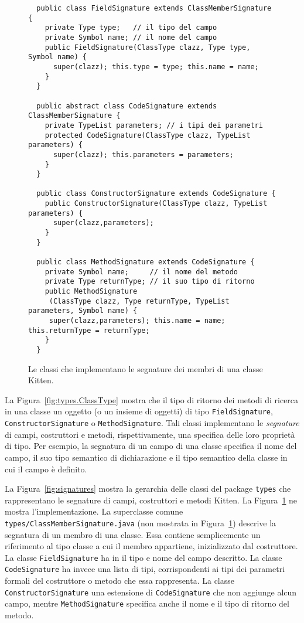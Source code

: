 \begin{figure}[t]
{\small
\begin{verbatim}
  public class FieldSignature extends ClassMemberSignature {
    private Type type;   // il tipo del campo
    private Symbol name; // il nome del campo
    public FieldSignature(ClassType clazz, Type type, Symbol name) {
      super(clazz); this.type = type; this.name = name;
    }
  }

  public abstract class CodeSignature extends ClassMemberSignature {
    private TypeList parameters; // i tipi dei parametri
    protected CodeSignature(ClassType clazz, TypeList parameters) {
      super(clazz); this.parameters = parameters;
    }
  }

  public class ConstructorSignature extends CodeSignature {
    public ConstructorSignature(ClassType clazz, TypeList parameters) {
      super(clazz,parameters);
    }
  }

  public class MethodSignature extends CodeSignature {
    private Symbol name;     // il nome del metodo
    private Type returnType; // il suo tipo di ritorno
    public MethodSignature
     (ClassType clazz, Type returnType, TypeList parameters, Symbol name) {
     super(clazz,parameters); this.name = name; this.returnType = returnType;
    }
  }
\end{verbatim}
}
\caption{Le classi che implementano le segnature dei membri di una classe Kitten.}
  \label{fig:members_signatures}
\end{figure}

La Figura~\ref{fig:types.ClassType} mostra che il tipo di ritorno dei metodi
di ricerca in una classe \e un oggetto (o un insieme di oggetti) di tipo
\texttt{FieldSignature}, \texttt{ConstructorSignature} o
\texttt{MethodSignature}. Tali classi implementano le \emph{segnature} di
campi, costruttori e metodi, rispettivamente, \cioe una specifica delle
loro propriet\`a di tipo. Per esempio, la segnatura di un campo di una classe
specifica il nome del campo, il suo tipo semantico di dichiarazione e
il tipo semantico della classe in cui il campo \`e definito.

La Figura~\ref{fig:signatures} mostra la gerarchia delle
classi del package \texttt{types}
che rappresentano le segnature di campi, costruttori e metodi Kitten.
La Figura~\ref{fig:members_signatures} ne mostra l'implementazione. La
superclasse comune \texttt{types/ClassMemberSignature.java} (non mostrata in
Figura~\ref{fig:members_signatures}) descrive
la segnatura di un membro di una classe. Essa contiene semplicemente un
riferimento al tipo classe a cui il membro appartiene, inizializzato
dal costruttore. La classe \texttt{FieldSignature}
ha in \piu il tipo e nome del campo descritto. La classe
\texttt{CodeSignature} ha invece una lista di tipi, corrispondenti
ai tipi dei parametri formali del costruttore o metodo
che essa rappresenta. La classe \texttt{ConstructorSignature}
\e una estensione di \texttt{CodeSignature} che non aggiunge alcun
campo, mentre \texttt{MethodSignature} specifica anche il nome e il tipo di
ritorno del metodo.
%
